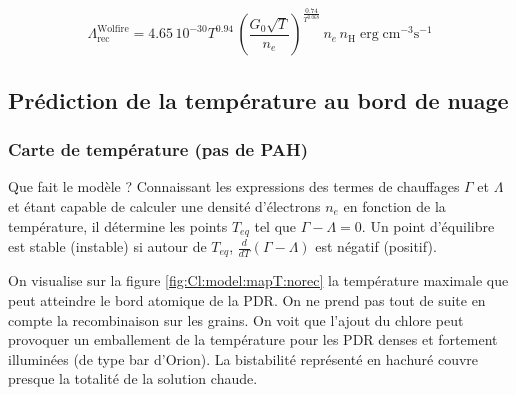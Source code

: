 \begin{equation}
    \Lambda_{\mathrm{rec}}^{\mathrm{Wolfire}} = 4.65\,10^{-30} T^{0.94} \, (\frac{G_0 \sqrt{T}}{n_e})^{\frac{0.74}{T^{0.068}}} \, n_e \, n_\mathrm{H} \operatorname{erg} \mathrm{cm}^{-3} \mathrm{s}^{-1}
\end{equation}


\subsection{Prédiction de la température au bord de nuage}
\subsubsection{Carte de température (pas de PAH)}

Que fait le modèle ? Connaissant les expressions des termes de chauffages $\Gamma$ et $\Lambda$ et étant capable de calculer une densité d'électrons $n_e$ en fonction de la température, il détermine les points $T_{eq}$ tel que $\Gamma - \Lambda  = 0$. Un point d'équilibre est stable (instable) si autour de $T_{eq}$, $\frac{d}{dT}(\Gamma - \Lambda)$ est négatif (positif). \newline 


On visualise sur la figure \ref{fig:Cl:model:mapT:norec} la température maximale que peut atteindre le bord atomique de la PDR. On ne prend pas tout de suite en compte la recombinaison sur les grains. On voit que l'ajout du chlore peut provoquer un emballement de la température pour les PDR denses et fortement illuminées (de type bar d'Orion). La bistabilité représenté en hachuré couvre presque la totalité de la solution chaude.   

